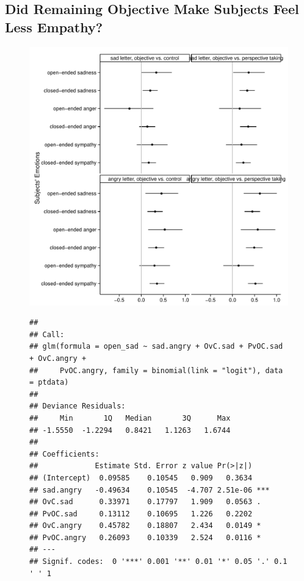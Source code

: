 \documentclass[man,a4paper,noextraspace,apacite]{apa6}\usepackage[]{graphicx}\usepackage[]{color}
\makeatletter
\def\maxwidth{ %
  \ifdim\Gin@nat@width>\linewidth
    \linewidth
  \else
    \Gin@nat@width
  \fi
}
\newenvironment{kframe}{%
 \def\at@end@of@kframe{}%
 \ifinner\ifhmode%
  \def\at@end@of@kframe{\end{minipage}}%
  \begin{minipage}{\columnwidth}%
 \fi\fi%
 \def\FrameCommand##1{\hskip\@totalleftmargin \hskip-\fboxsep
 \colorbox{shadecolor}{##1}\hskip-\fboxsep
     \hskip-\linewidth \hskip-\@totalleftmargin \hskip\columnwidth}%
 \MakeFramed {\advance\hsize-\width
   \@totalleftmargin\z@ \linewidth\hsize
   \@setminipage}}%
 {\par\unskip\endMakeFramed%
 \at@end@of@kframe}
\newenvironment{knitrout}{}{} %
\makeatother
\begin{document}
\subsection{Did Remaining Objective Make Subjects Feel Less Empathy?}

\begin{figure}
\begin{knitrout}
\color{fgcolor}
\includegraphics[width=\maxwidth]{figure/Figure5CIPlotsObjectiveVSOthers-1} 
\begin{kframe}\begin{verbatim}
## 
## Call:
## glm(formula = open_sad ~ sad.angry + OvC.sad + PvOC.sad + OvC.angry + 
##     PvOC.angry, family = binomial(link = "logit"), data = ptdata)
## 
## Deviance Residuals: 
##     Min       1Q   Median       3Q      Max  
## -1.5550  -1.2294   0.8421   1.1263   1.6744  
## 
## Coefficients:
##             Estimate Std. Error z value Pr(>|z|)    
## (Intercept)  0.09585    0.10545   0.909   0.3634    
## sad.angry   -0.49634    0.10545  -4.707 2.51e-06 ***
## OvC.sad      0.33971    0.17797   1.909   0.0563 .  
## PvOC.sad     0.13112    0.10695   1.226   0.2202    
## OvC.angry    0.45782    0.18807   2.434   0.0149 *  
## PvOC.angry   0.26093    0.10339   2.524   0.0116 *  
## ---
## Signif. codes:  0 '***' 0.001 '**' 0.01 '*' 0.05 '.' 0.1 ' ' 1

\end{verbatim}
\end{kframe}
\end{knitrout}
\end{figure}
\end{document}
